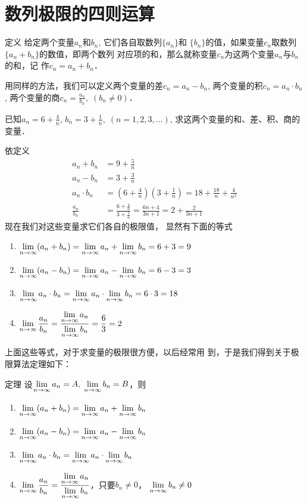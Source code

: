\section{数列极限的四则运算}
\begin{blk}{定义}
 给定两个变量$a_n$和$b_n$, 它们各自取数列$\{a_n\}$和
$\{b_n\}$的值，如果变量$c_n$取数列$\{a_n+b_n\}$的数值，即两个数列
对应项的和，那么就称变量$c_n$为这两个变量$a_n$与$b_n$的和，记
作$c_n=a_n+b_n$．   
\end{blk}
 
用同样的方法，我们可以定义两个变量的差$c_n=a_n-b_n$,
 两个变量的积$c_n=a_n\cdot b_n$, 两个变量的商$c_n=\frac{a_n}{b_n},\; (b_n\ne 0)$．



\begin{example}
    已知$a_n=6+\frac{4}{n}$, $b_n=3+\frac{1}{n},\; (n=1,2,3,
\ldots)$, 求这两个变量的和、差、积、商的变量．
\end{example}

\begin{solution}
    依定义
\[\begin{split}
    a_n+b_n&=9+\frac{5}{n}\\
a_n-b_n&=3+\frac{3}{n}\\
a_n\cdot b_n&=\left(6+\frac{4}{n}\right)\left(3+\frac{1}{n}\right)=18+\frac{18}{n}+\frac{4}{n^2}\\
\frac{a_n}{b_n}&=\frac{6+\frac{4}{n}}{3+\frac{1}{n}}=\frac{6n+4}{3n+1}=2+\frac{2}{3n+1}
\end{split}\]
现在我们对这些变量求它们各自的极限值，
显然有下面的等式
\begin{enumerate}
    \item $\displaystyle\lim_{n\to\infty}(a_n+b_n)=\displaystyle\lim_{n\to\infty}a_n+\displaystyle\lim_{n\to\infty}b_n=6+3=9$
    \item $\displaystyle\lim_{n\to\infty}(a_n-b_n)=\displaystyle\lim_{n\to\infty}a_n-\displaystyle\lim_{n\to\infty}b_n=6-3=3$
    \item $\displaystyle\lim_{n\to\infty}a_n\cdot b_n=\displaystyle\lim_{n\to\infty}a_n\cdot \displaystyle\lim_{n\to\infty}b_n=6\cdot 3=18$
    \item $\displaystyle\lim_{n\to\infty}\dfrac{a_n}{b_n}=\dfrac{\displaystyle\lim_{n\to\infty}a_n}{\displaystyle\lim_{n\to\infty}b_n}=\dfrac{6}{3}=2$
\end{enumerate}
\end{solution}

上面这些等式，对于求变量的极限很方便，以后经常用
到，于是我们得到关于极限算法定理如下：

\begin{blk}{定理}
设$\displaystyle\lim_{n\to\infty}a_n=A,\; \displaystyle\lim_{n\to\infty}b_n=B$，则
\begin{enumerate}
    \item $\displaystyle\lim_{n\to\infty}(a_n+b_n)=\displaystyle\lim_{n\to\infty}a_n+\displaystyle\lim_{n\to\infty}b_n$
    \item $\displaystyle\lim_{n\to\infty}(a_n-b_n)=\displaystyle\lim_{n\to\infty}a_n-\displaystyle\lim_{n\to\infty}b_n$
    \item $\displaystyle\lim_{n\to\infty}a_n\cdot b_n=\displaystyle\lim_{n\to\infty}a_n\cdot \displaystyle\lim_{n\to\infty}b_n$
    \item $\displaystyle\lim_{n\to\infty}\dfrac{a_n}{b_n}=\dfrac{\displaystyle\lim_{n\to\infty}a_n}{\displaystyle\lim_{n\to\infty}b_n}$，只要$b_n\ne 0$， $\displaystyle\lim_{n\to\infty}b_n\ne 0$
\end{enumerate}
 \end{blk}

